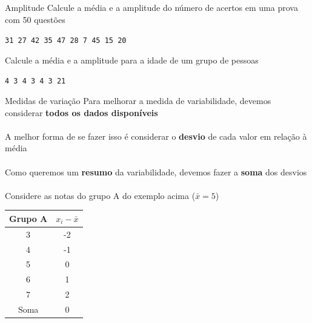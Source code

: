 \documentclass[10pt]{beamer}\usepackage[]{graphicx}\usepackage[]{color}
\theoremstyle{definition}
\begin{document}
\begin{frame}{Amplitude}
  Calcule a média e a amplitude do número de acertos em uma prova com 50
  questões
  \begin{center}
    \texttt{31 27 42 35 47 28 7 45 15 20}
  \end{center}
  \vspace{1em}
  Calcule a média e a amplitude para a idade de um grupo de pessoas
  \begin{center}
    \texttt{4 3 4 3 4 3 21}
  \end{center}
\end{frame}

\begin{frame}{Medidas de variação}
  Para melhorar a medida de variabilidade, devemos considerar
  \textbf{todos os dados disponíveis} \\~\\
  A melhor forma de se fazer isso é considerar o \textbf{desvio} de cada
  valor em relação à média \\~\\
  Como queremos um \textbf{resumo} da variabilidade, devemos fazer a
  \textbf{soma} dos desvios \\~\\
  Considere as notas do grupo A do exemplo acima ($\bar{x} = 5$)
    \begin{table}[htbp]
    \centering
    \begin{tabular}{cc}
      \hline
      \textbf{Grupo A} & $x_i - \bar{x}$ \\ \hline
      3 & -2 \\
      4 & -1\\
      5 & 0\\
      6 & 1\\
      7 & 2\\
      \hline
      Soma & 0 \\
      \hline
    \end{tabular}
  \end{table}
\end{frame}
\end{document}
